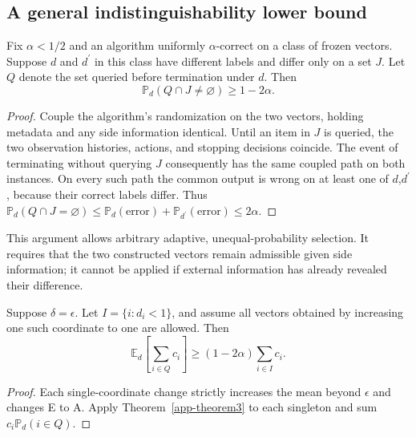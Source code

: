 \subsection{A general indistinguishability lower bound}\label{theory:5}

\begin{theorem}\label{app-theorem3} Fix \(\alpha<1/2\) and an algorithm uniformly \(\alpha\)-correct on a class of frozen vectors. Suppose \(d\) and \(d^{\prime}\) in this class have different labels and differ only on a set \(J\). Let \(Q\) denote the set queried before termination under \(d\). Then
\begin{equation}\label{eq:proofs-5}
\mathbb P_d(Q\cap J\ne\varnothing)\ge1-2\alpha.
\end{equation}
\end{theorem}

\begin{proof} Couple the algorithm's randomization on the two vectors, holding metadata and any side information identical. Until an item in \(J\) is queried, the two observation histories, actions, and stopping decisions coincide. The event of terminating without querying \(J\) consequently has the same coupled path on both instances. On every such path the common output is wrong on at least one of \(d\),\(d^{\prime}\), because their correct labels differ. Thus \(\mathbb P_d(Q\cap J=\varnothing)\le\mathbb P_d(\mathrm{error})+\mathbb P_{d^{\prime}}(\mathrm{error})\le2\alpha\). \end{proof}

This argument allows arbitrary adaptive, unequal-probability selection. It requires that the two constructed vectors remain admissible given side information; it cannot be applied if external information has already revealed their difference.

\begin{corollary}\label{app-corollary3-1} Suppose \(\delta=\epsilon\). Let \(I=\{i:d_i<1\}\), and assume all vectors obtained by increasing one such coordinate to one are allowed. Then
\begin{equation}\label{eq:proofs-6}
\mathbb E_d\!\left[\sum_{i\in Q}c_i\right]\ge(1-2\alpha)\sum_{i\in I}c_i.
\end{equation}
\end{corollary}

\begin{proof} Each single-coordinate change strictly increases the mean beyond \(\epsilon\) and changes E to A. Apply Theorem~\ref{app-theorem3} to each singleton and sum \(c_i\mathbb P_d(i\in Q)\). \end{proof}

